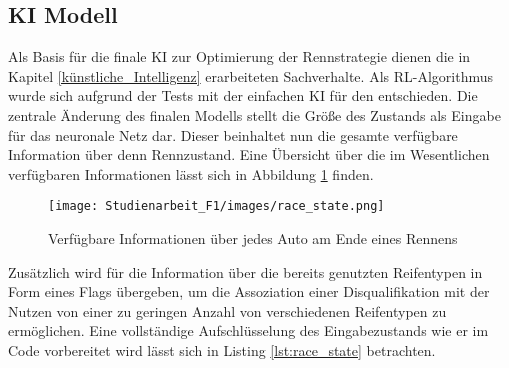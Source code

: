 \subsection{KI Modell}
Als Basis für die finale KI zur Optimierung der Rennstrategie dienen die in Kapitel \ref{künstliche_Intelligenz} erarbeiteten Sachverhalte. Als RL-Algorithmus wurde sich aufgrund der Tests mit der einfachen KI für den  entschieden. Die zentrale Änderung des finalen Modells stellt die Größe des Zustands als Eingabe für das neuronale Netz dar. Dieser beinhaltet nun die gesamte verfügbare Information über denn Rennzustand. Eine Übersicht über die im Wesentlichen verfügbaren Informationen lässt sich in Abbildung \ref{fig:race_state} finden.
\begin{figure}
    \centering
    \texttt{[image: Studienarbeit\_F1/images/race\_state.png]}
    \caption{Verfügbare Informationen über jedes Auto am Ende eines Rennens}
    \label{fig:race_state}
\end{figure}
Zusätzlich wird für die Information über die bereits genutzten Reifentypen in Form eines Flags übergeben, um die Assoziation einer Disqualifikation mit der Nutzen von einer zu geringen Anzahl von verschiedenen Reifentypen zu ermöglichen. Eine vollständige Aufschlüsselung des Eingabezustands wie er im Code vorbereitet wird lässt sich in Listing \ref{lst:race_state} betrachten.

